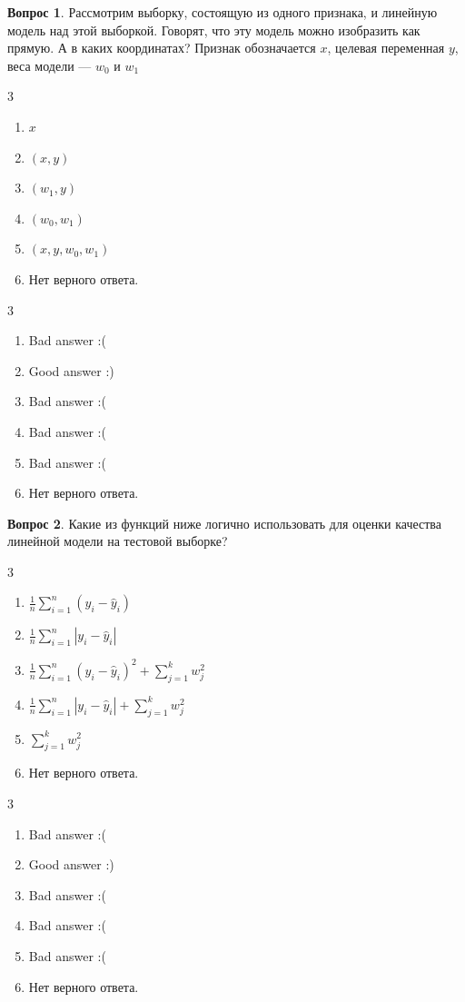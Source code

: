 \documentclass[12pt]{article}
\newenvironment{answerlist}[1][3]{
\begin{multicols}{#1}

\begin{enumerate}[label=\fbox{\emph{\Alph*}},ref=\emph{\alph*}]
}
{
\item Нет верного ответа.
\end{enumerate}
\end{multicols}
}
\theoremstyle{definition}
\newtheorem{question}{Вопрос}
\begin{document}
\begin{question}
Рассмотрим выборку, состоящую из одного признака, и линейную модель над этой выборкой. Говорят, что эту модель можно изобразить как прямую. А в каких координатах? Признак обозначается $x$, целевая переменная $y$, веса модели — $w_0$ и $w_1$
\begin{answerlist}
   \item  $x$
   \item  $(x, y)$
   \item  $(w_1, y)$
   \item  $(w_0, w_1)$
   \item  $(x, y, w_0, w_1)$
\end{answerlist}
\end{question}

\begin{solution}
\begin{answerlist}
  \item Bad answer :(
  \item Good answer :)
  \item Bad answer :(
  \item Bad answer :(
  \item Bad answer :(
\end{answerlist}
\end{solution}

\begin{question}
Какие из функций ниже логично использовать для оценки качества линейной модели на тестовой выборке? 
\begin{answerlist}
   \item  \( \frac{1}{n} \sum_{i=1}^n (y_i - \hat y_i) \)
   \item  \( \frac{1}{n} \sum_{i=1}^n|y_i - \hat y_i| \)
   \item  \( \frac{1}{n} \sum_{i=1}^n (y_i - \hat y_i)^2 + \sum_{j=1}^k w_j^2 \)
   \item  \( \frac{1}{n} \sum_{i=1}^n |y_i - \hat y_i| + \sum_{j=1}^k w_j^2 \)
   \item  \( \sum_{j=1}^k w_j^2 \)
\end{answerlist}
\end{question}

\begin{solution}
\begin{answerlist}
  \item Bad answer :(
  \item Good answer :)
  \item Bad answer :(
  \item Bad answer :(
  \item Bad answer :(
\end{answerlist}
\end{solution}
\end{document}
